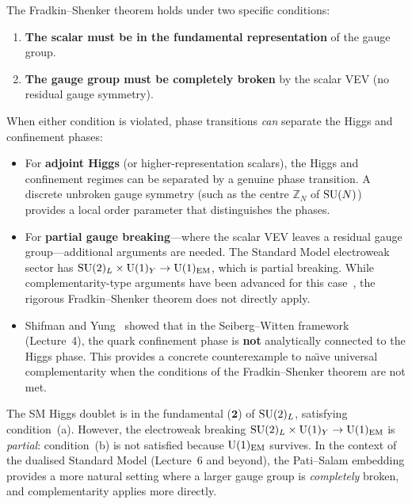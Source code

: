 \documentclass[11pt,a4paper]{article}
\begin{document}
\begin{warningbox}[title={Complementarity is not universal}]
The Fradkin--Shenker theorem holds under two specific conditions:
\begin{enumerate}[label=(\alph*)]
  \item \textbf{The scalar must be in the fundamental representation}
    of the gauge group.

  \item \textbf{The gauge group must be completely broken} by the
    scalar VEV (no residual gauge symmetry).
\end{enumerate}
When either condition is violated, phase transitions \emph{can}
separate the Higgs and confinement phases:
\begin{itemize}
  \item For \textbf{adjoint Higgs} (or higher-representation scalars),
    the Higgs and confinement regimes can be separated by a genuine
    phase transition.  A discrete unbroken gauge symmetry (such as
    the centre $\mathbb{Z}_N$ of $\mathrm{SU}(N)$) provides a local order
    parameter that distinguishes the phases.

  \item For \textbf{partial gauge breaking}---where the scalar VEV
    leaves a residual gauge group---additional arguments are needed.
    The Standard Model electroweak sector has $\mathrm{SU}(2)_L \times
    \mathrm{U}(1)_Y \to \mathrm{U}(1)_{\mathrm{EM}}$, which is partial breaking.
    While complementarity-type arguments have been advanced for
    this case~\cite{AbbottFarhi1981,CT2011}, the rigorous Fradkin--Shenker
    theorem does not directly apply.

  \item Shifman and Yung~\cite{SY2017} showed that in the
    Seiberg--Witten framework (Lecture~4), the quark confinement
    phase is \textbf{not} analytically connected to the Higgs phase.
    This provides a concrete counterexample to na\"{\i}ve universal
    complementarity when the conditions of the Fradkin--Shenker
    theorem are not met.
\end{itemize}
\end{warningbox}

\begin{remark}
  The SM Higgs doublet is in the fundamental ($\mathbf{2}$) of
  $\mathrm{SU}(2)_L$, satisfying condition~(a).  However, the electroweak
  breaking $\mathrm{SU}(2)_L \times \mathrm{U}(1)_Y \to \mathrm{U}(1)_{\mathrm{EM}}$
  is \emph{partial}: condition~(b) is not satisfied because
  $\mathrm{U}(1)_{\mathrm{EM}}$ survives.  In the context of the dualised
  Standard Model (Lecture~6 and beyond), the Pati--Salam embedding
  provides a more natural setting where a larger gauge group is
  \emph{completely} broken, and complementarity applies more directly.
\end{remark}
\end{document}
